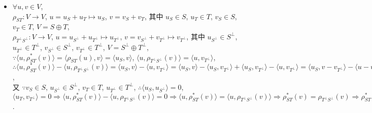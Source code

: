 \documentclass{note}
\begin{document}
\begin{pf}
\begin{itemize}
        $\forall v\in\im\tau^*$, $\exists w\in W$, s.t. $v=\tau^*(w)$,\\
        $\because\tau$ 为共轭同构, $\therefore\exists u\in V$, s.t. $w=\tau(u)\Longrightarrow v=\tau^*\tau(u)$, 故 $\im\tau^*\in\im\tau^*\tau$.

        综上, $\im\tau^*\tau=\im\tau^*$.

        同理, $\im\tau\tau^*=\im\tau$.
        \item[(4)] $\forall u,v\in V$,\\
        $\rho_{ST}:V\rightarrow V$, $u=u_S+u_T\mapsto u_S$, $v=v_S+v_T$, 其中 $u_S\in S$, $u_T\in T$, $v_S\in S$, $v_T\in T$, $V=S\oplus T$,\\
        $\rho_{T^{\perp}S^{\perp}}:V\rightarrow V$, $u=u_{S^{\perp}}+u_{T^{\perp}}\mapsto u_{T^{\perp}}$, $v=v_{S^{\perp}}+v_{T^{\perp}}\mapsto v_{T^{\perp}}$, 其中 $u_{S^{\perp}}\in S^{\perp}$, $u_{T^{\perp}}\in T^{\perp}$, $v_{S^{\perp}}\in S^{\perp}$, $v_{T^{\perp}}\in T^{\perp}$, $V=S^{\perp}\oplus T^{\perp}$,\\
        $\because\langle u,\rho_{ST}^*(v)\rangle=\langle\rho_{ST}(u),v\rangle=\langle u_S,v\rangle$, $\langle u,\rho_{T^{\perp}S^{\perp}}(v)\rangle=\langle u,v_{T^{\perp}}\rangle$,\\
        $\therefore\langle u,\rho_{ST}^*(v)\rangle-\langle u,\rho_{T^{\perp}S^{\perp}}(v)\rangle=\langle u_S,v\rangle-\langle u,v_{T^{\perp}}\rangle=\langle u_S,v\rangle-\langle u_S,v_{T^{\perp}}\rangle+\langle u_S,v_{T^{\perp}}\rangle-\langle u,v_{T^{\perp}}\rangle=\langle u_S,v-v_{T^{\perp}}\rangle-\langle u-u_S,v_{T^{\perp}}\rangle=\langle u_S,v_{S^{\perp}}\rangle-\langle u_T,v_{T^{\perp}}\rangle$,\\
        又 $\because v_S\in S$, $u_{S^{\perp}}\in S^{\perp}$, $v_T\in T$, $u_{T^{\perp}}\in T^{\perp}$, $\therefore\langle u_S,u_{S^{\perp}}\rangle=0$, $\langle u_T,v_{T^{\perp}}\rangle=0\Longrightarrow\langle u,\rho_{ST}^*(v)\rangle-\langle u,\rho_{T^{\perp}S^{\perp}}(v)\rangle=0\Longrightarrow\langle u,\rho_{ST}^*(v)\rangle=\langle u,\rho_{T^{\perp}S^{\perp}}(v)\rangle\Longrightarrow\rho_{ST}^*(v)=\rho_{T^{\perp}S^{\perp}}(v)\Longrightarrow\rho_{ST}^*=\rho_{T^{\perp}S^{\perp}}$.
    \end{itemize}
\end{pf}
\end{document}
